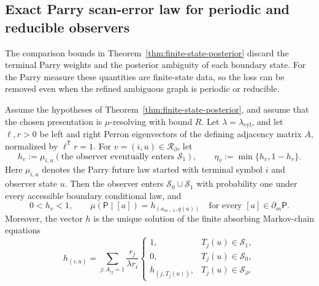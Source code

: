 
\subsection{Exact Parry scan-error law for periodic and reducible observers}
\label{sub:exact-parry-scan-law}

The comparison bounds in Theorem~\ref{thm:finite-state-posterior} discard the
terminal Parry weights and the posterior ambiguity of each boundary state.
For the Parry measure these quantities are finite-state data, so the loss can
be removed even when the refined ambiguous graph is periodic or reducible.

\begin{lemma}
\label{lem:parry-observer-absorption}
Assume the hypotheses of Theorem~\ref{thm:finite-state-posterior}, and assume
that the chosen presentation is $\mu$-resolving with bound $R$.  Let
$\lambda=\lambda_{\mathrm{cyl}}$, and let $\ell,r>0$ be left and right
Perron eigenvectors of the defining adjacency matrix $A$, normalized by
$\ell^{\mathsf T}r=1$.  For $v=(i,u)\in\mathcal R_\partial$, let
\[
h_v:=\mu_{i,u}(\text{the observer eventually enters }\mathcal S_1),
\qquad \eta_v:=\min\{h_v,1-h_v\}.
\]
Here $\mu_{i,u}$ denotes the Parry future law started with terminal symbol
$i$ and observer state $u$.  Then the observer enters
$\mathcal S_0\cup\mathcal S_1$ with probability one under every accessible
boundary conditional law, and
\[
0<h_v<1,\qquad
\mu(\mathsf P\mid[a])=h_{(a_{m-1},q(a))}
\quad\text{for every }[a]\in\partial_m\mathsf P.
\]
Moreover, the vector $h$ is the unique solution of the finite absorbing
Markov-chain equations
\[
h_{(i,u)}=\sum_{j:A_{ij}=1}
\frac{r_j}{\lambda r_i}
\begin{cases}
1,&T_j(u)\in\mathcal S_1,\\
0,&T_j(u)\in\mathcal S_0,\\
h_{(j,T_j(u))},&T_j(u)\in\mathcal S_\partial.
\end{cases}
\]
\end{lemma}


